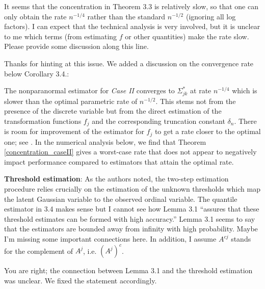 \begin{point}
    It seems that the concentration in Theorem 3.3 is relatively slow, so that one can only obtain the rate \(n^{-1/4}\) rather than the standard \(n^{-1/2}\) (ignoring all log factors). I can expect that the technical analysis is very involved, but it is unclear to me which terms (from estimating \(f\) or other quantities) make the rate slow. Please provide some discussion along this line.
\end{point}

\begin{reply}
    Thanks for hinting at this issue. We added a discussion on the convergence rate below Corollary 3.4.:
\end{reply}

\begin{change}
    The nonparanormal estimator for \textit{Case II} converges to \(\Sigma_{jk}^*\) at rate \(n^{-1/4}\) which is slower than the optimal parametric rate of \(n^{-1/2}\). This stems not from the presence of the discrete variable but from the direct estimation of the transformation functions \({f}_j\) and the corresponding truncation constant \(\delta_n\). There is room for improvement of the estimator for \(f_j\) to get a rate closer to the optimal one; see \citep{Xue12}. In the numerical analysis below, we find that Theorem \ref{concentration_caseII} gives a worst-case rate that does not appear to negatively impact performance compared to estimators that attain the optimal rate.
\end{change}


\reviewersection

\begin{point}
    \textbf{Threshold estimation}: As the authors noted, the two-step estimation procedure relies crucially on the estimation of the unknown thresholds which map the latent Gaussian variable to the observed ordinal variable. The quantile estimator in 3.4 makes sense but I cannot see how Lemma 3.1 “assures that these threshold estimates can be formed with high accuracy.” Lemma 3.1 seems to say that the estimators are bounded away from infinity with high probability. Maybe I’m missing some important connections here. In addition, I assume \(A^{cj}\) stands for the complement of \(
    A^j\), i.e. \((A^j)^c\).
\end{point}

\begin{reply}
    You are right; the connection between Lemma 3.1 and the threshold estimation was unclear. We fixed the statement accordingly.
\end{reply}

